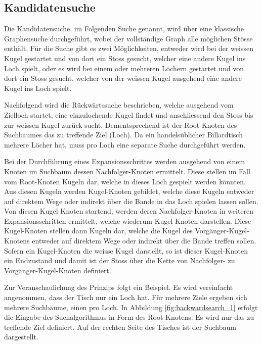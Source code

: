 \subsection{Kandidatensuche}\label{sec:kandidatensuche}
Die Kandidatensuche, im Folgenden Suche genannt, wird über eine klassische Graphensuche durchgeführt, wobei der vollständige
Graph alle möglichen Stösse enthält.
Für die Suche gibt es zwei Möglichkeiten, entweder wird bei der weissen Kugel gestartet und von dort ein Stoss gesucht,
welcher eine andere Kugel ins Loch spielt, oder es wird bei einem oder mehreren Löchern gestartet und von dort ein Stoss gesucht,
welcher von der weissen Kugel ausgehend eine andere Kugel ins Loch spielt.

Nachfolgend wird die Rückwärtssuche beschrieben, welche ausgehend vom Zielloch startet, eine einzulochende Kugel findet
und anschliessend den Stoss bis zur weissen Kugel zurück sucht.
Dementsprechend ist der Root-Knoten des Suchbaumes das zu treffende Ziel (Loch).
Da ein handelsüblicher Billardtisch mehrere Löcher hat, muss pro Loch eine separate Suche durchgeführt werden.

Bei der Durchführung eines Expansionsschrittes werden ausgehend von einem Knoten im Suchbaum dessen Nachfolger-Knoten ermittelt.
Diese stellen im Fall vom Root-Knoten Kugeln dar, welche in dieses Loch gespielt werden könnten.
Aus diesen Kugeln werden Kugel-Knoten gebildet, welche diese Kugeln entweder auf direktem Wege oder indirekt über die Bande
in das Loch spielen lassen sollen.
Von diesen Kugel-Knoten startend, werden deren Nachfolger-Knoten in weiteren Expansionsschritten ermittelt, welche
wiederum Kugel-Knoten darstellen.
Diese Kugel-Knoten stellen dann Kugeln dar, welche die Kugel des Vorgänger-Kugel-Knotens entweder auf direktem Wege oder indirekt
über die Bande treffen sollen.
Sofern ein Kugel-Knoten die weisse Kugel darstellt, so ist dieser Kugel-Knoten ein Endzustand und damit ist der Stoss
über die Kette von Nachfolger- zu Vorgänger-Kugel-Knoten definiert.

Zur Veranschaulichung des Prinzips folgt ein Beispiel. Es wird vereinfacht angenommen,
dass der Tisch nur ein Loch hat. Für mehrere Ziele ergeben sich mehrere Suchbäume, einen pro Loch.
In Abbildung \ref{fig:backwardsearch_1} erfolgt die Eingabe des Suchalgorithmus in Form des Root-Knotens.
Es wird nur das zu treffende Ziel definiert. Auf der rechten Seite des Tisches ist der Suchbaum dargestellt.

